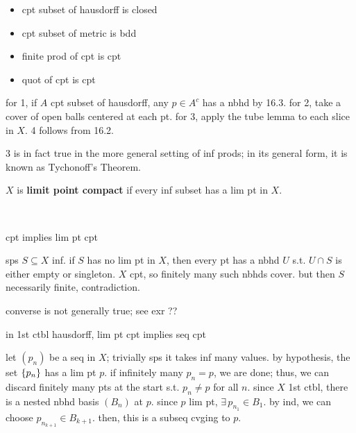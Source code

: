 \begin{prop} \vspace{-0.275in}
    \begin{itemize}
        \item cpt subset of hausdorff is closed
        \item cpt subset of metric is bdd
        \item finite prod of cpt is cpt
        \item quot of cpt is cpt
    \end{itemize}
\end{prop}

\begin{pf}[source=Primary Source Material]
    for 1, if $A$ cpt subset of hausdorff, any $p\in A^{c}$ has a nbhd by 16.3.
    for 2, take a cover of open balls centered at each pt.
    for 3, apply the tube lemma to each slice in $X$.
    4 follows from 16.2.
\end{pf}
3 is in fact true in the more general setting of inf prods;
in its general form, it is known as Tychonoff's Theorem.

\begin{defn}
    $X$ is \textbf{limit point compact} if every inf subset has a lim pt in $X$.
\end{defn} \

\begin{lm}
    cpt implies lim pt cpt
\end{lm}

\begin{pf}[source=Primary Source Material]
    sps $S\subseteq X$ inf.
    if $S$ has no lim pt in $X$, then every pt has a nbhd $U$ s.t. $U\cap S$ is
    either empty or singleton.
    $X$ cpt, so finitely many such nbhds cover.
    but then $S$ necessarily finite, contradiction.
\end{pf}
converse is not generally true; see exr ??

\begin{prop}
    in 1st ctbl hausdorff, lim pt cpt implies seq cpt
\end{prop}

\begin{pf}[source=Primary Source Material]
    let $(p_{n})$ be a seq in $X$; trivially sps it takes inf many values.
    by hypothesis, the set $\left\{{p_{n}}\right\}$ has a lim pt $p$.
    if infinitely many $p_{n}=p$, we are done;
    thus, we can discard finitely many pts at the start s.t. $p_{n}\neq p$ for
    all $n$.
    since $X$ 1st ctbl, there is a nested nbhd basis $(B_{n})$ at $p$.
    since $p$ lim pt, $\exists \,p_{n_{1}}\in B_{1}$.
    by ind, we can choose $p_{n_{k+1}}\in B_{k+1}$.
    then, this is a subseq cvging to $p$.
\end{pf}

